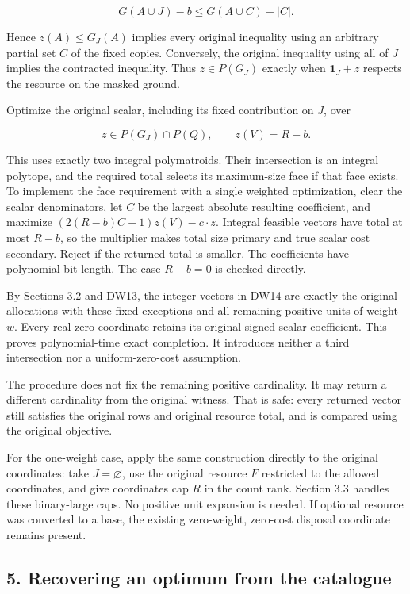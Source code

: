 \[
G(A\cup J)-b\le G(A\cup C)-|C|.
\tag{DW13}
\]

Hence \(z(A)\le G_J(A)\) implies every original inequality using an arbitrary partial set \(C\) of the fixed copies. Conversely, the original inequality using all of \(J\) implies the contracted inequality. Thus \(z\in P(G_J)\) exactly when \(\mathbf1_J+z\) respects the resource on the masked ground.

Optimize the original scalar, including its fixed contribution on \(J\), over

\[
z\in P(G_J)\cap P(Q),
\qquad z(V)=R-b.
\tag{DW14}
\]

This uses exactly two integral polymatroids. Their intersection is an integral polytope, and the required total selects its maximum-size face if that face exists. To implement the face requirement with a single weighted optimization, clear the scalar denominators, let \(C\) be the largest absolute resulting coefficient, and maximize \((2(R-b)C+1)z(V)-c\cdot z\). Integral feasible vectors have total at most \(R-b\), so the multiplier makes total size primary and true scalar cost secondary. Reject if the returned total is smaller. The coefficients have polynomial bit length. The case \(R-b=0\) is checked directly.

By Sections 3.2 and DW13, the integer vectors in DW14 are exactly the original allocations with these fixed exceptions and all remaining positive units of weight \(w\). Every real zero coordinate retains its original signed scalar coefficient. This proves polynomial-time exact completion. It introduces neither a third intersection nor a uniform-zero-cost assumption.

The procedure does not fix the remaining positive cardinality. It may return a different cardinality from the original witness. That is safe: every returned vector still satisfies the original rows and original resource total, and is compared using the original objective.

For the one-weight case, apply the same construction directly to the original coordinates: take \(J=\varnothing\), use the original resource \(F\) restricted to the allowed coordinates, and give coordinates cap \(R\) in the count rank. Section 3.3 handles these binary-large caps. No positive unit expansion is needed. If optional resource was converted to a base, the existing zero-weight, zero-cost disposal coordinate remains present.

\hypertarget{af-fe230a140d-recovering-an-optimum-from-the-catalogue}{%
\subsection{5. Recovering an optimum from the catalogue}\label{af-fe230a140d-recovering-an-optimum-from-the-catalogue}}

